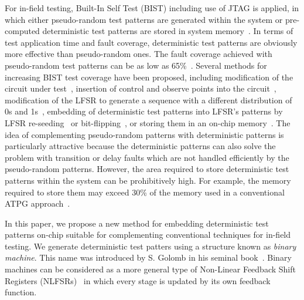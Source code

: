 \documentclass[10pt,conference]{IEEEtran}
\begin{document}
For in-field testing, Built-In Self Test (BIST) including use of JTAG 
is applied, in which either pseudo-random test patterns are generated 
within the system or pre-computed deterministic test patterns are stored 
in system memory~\cite{MaA10}.  
In terms of test application
time and fault coverage, deterministic test patterns are obviously more effective 
than pseudo-random ones. The fault coverage achieved with  pseudo-random test patterns
can be as low as 65\%~\cite{DaT00}. 
Several methods for increasing BIST test coverage have been proposed, including modification of the circuit under test~\cite{EiL83}, insertion of control and observe points into the circuit~\cite{RaTKM04}, modification of the LFSR to generate a
sequence with a different distribution of 0s and 1s~\cite{ChM84},
embedding of deterministic test patterns into LFSR's patterns by 
LFSR re-seeding~\cite{Jer08} or bit-flipping~\cite{WuK96}, or storing 
them in an on-chip memory~\cite{SaDB84}. The idea of complementing pseudo-random patterns with deterministic patterns 
is particularly attractive because the deterministic patterns can also solve 
the problem with transition or delay faults which are not handled efficiently by the
pseudo-random patterns. 
However, the area required to store deterministic test patterns
within the system can be prohibitively high.
For example, the memory required to store them may exceed 30\% of the memory used in a conventional ATPG approach~\cite{HeF99}.



In this paper, we propose a new method for embedding deterministic test patterns
on-chip suitable for complementing conventional techniques for in-field testing. 
We generate deterministic test patters using a structure known as {\em binary machine}. This name was introduced by S. Golomb in his seminal book~\cite{Golomb_book}.
Binary machines can be considered as a more general type of 
Non-Linear Feedback Shift Registers (NLFSRs)~\cite{Ja89}
in which every stage is updated by its own feedback function. 
\end{document}
